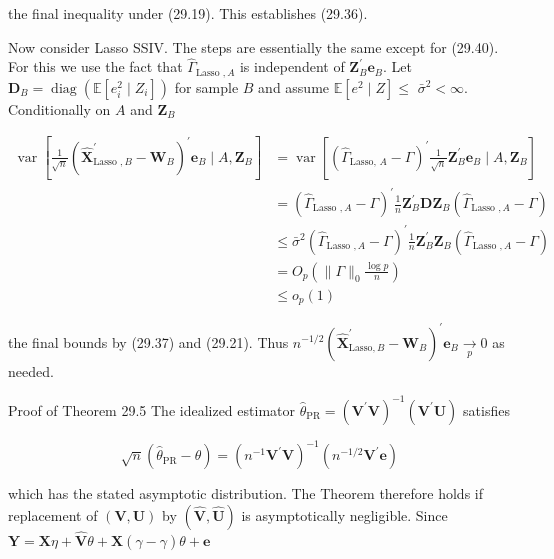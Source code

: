 \documentclass[10pt]{article}
\begin{document}
the final inequality under (29.19). This establishes (29.36).

Now consider Lasso SSIV. The steps are essentially the same except for (29.40). For this we use the fact that $\widehat{\Gamma}_{\text {Lasso }, A}$ is independent of $\boldsymbol{Z}_{B}^{\prime} \boldsymbol{e}_{B}$. Let $\boldsymbol{D}_{B}=\operatorname{diag}\left(\mathbb{E}\left[e_{i}^{2} \mid Z_{i}\right]\right)$ for sample $B$ and assume $\mathbb{E}\left[e^{2} \mid Z\right] \leq$ $\bar{\sigma}^{2}<\infty$. Conditionally on $A$ and $\boldsymbol{Z}_{B}$

$$
\begin{aligned}
\operatorname{var}\left[\frac{1}{\sqrt{n}}\left(\widehat{\boldsymbol{X}}_{\text {Lasso }, B}^{\prime}-\boldsymbol{W}_{B}\right)^{\prime} \boldsymbol{e}_{B} \mid A, \boldsymbol{Z}_{B}\right] &=\operatorname{var}\left[\left(\widehat{\Gamma}_{\text {Lasso, } A}-\Gamma\right)^{\prime} \frac{1}{\sqrt{n}} \boldsymbol{Z}_{B}^{\prime} \boldsymbol{e}_{B} \mid A, \boldsymbol{Z}_{B}\right] \\
&=\left(\widehat{\Gamma}_{\text {Lasso }, A}-\Gamma\right)^{\prime} \frac{1}{n} \boldsymbol{Z}_{B}^{\prime} \boldsymbol{D} \boldsymbol{Z}_{B}\left(\widehat{\Gamma}_{\text {Lasso }, A}-\Gamma\right) \\
& \leq \bar{\sigma}^{2}\left(\widehat{\Gamma}_{\text {Lasso }, A}-\Gamma\right)^{\prime} \frac{1}{n} \boldsymbol{Z}_{B}^{\prime} \boldsymbol{Z}_{B}\left(\widehat{\Gamma}_{\text {Lasso }, A}-\Gamma\right) \\
&=O_{p}\left(\|\Gamma\|_{0} \frac{\log p}{n}\right) \\
& \leq o_{p}(1)
\end{aligned}
$$

the final bounds by (29.37) and (29.21). Thus $n^{-1 / 2}\left(\widehat{\boldsymbol{X}}_{\mathrm{Lasso}, B}^{\prime}-\boldsymbol{W}_{B}\right)^{\prime} \boldsymbol{e}_{B} \underset{p}{\longrightarrow} 0$ as needed.

Proof of Theorem 29.5 The idealized estimator $\widehat{\theta}_{\mathrm{PR}}=\left(\boldsymbol{V}^{\prime} \boldsymbol{V}\right)^{-1}\left(\boldsymbol{V}^{\prime} \boldsymbol{U}\right)$ satisfies

$$
\sqrt{n}\left(\widehat{\theta}_{\mathrm{PR}}-\theta\right)=\left(n^{-1} \boldsymbol{V}^{\prime} \boldsymbol{V}\right)^{-1}\left(n^{-1 / 2} \boldsymbol{V}^{\prime} \boldsymbol{e}\right)
$$

which has the stated asymptotic distribution. The Theorem therefore holds if replacement of $(\boldsymbol{V}, \boldsymbol{U})$ by $(\widehat{\boldsymbol{V}}, \widehat{\boldsymbol{U}})$ is asymptotically negligible. Since $\boldsymbol{Y}=\boldsymbol{X} \eta+\widehat{\boldsymbol{V}} \theta+\boldsymbol{X}(\widehat{\gamma}-\gamma) \theta+\boldsymbol{e}$
\end{document}
